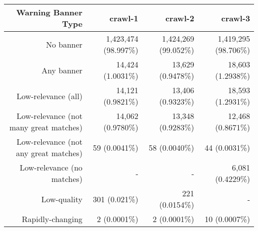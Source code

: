 \begin{tabular}{rrrr}
\toprule
\textbf{Warning Banner Type} & \textbf{crawl-1} & \textbf{crawl-2} & \textbf{crawl-3} \\
\midrule
No banner & 1,423,474 (98.997\%) & 1,424,269 (99.052\%) & 1,419,295 (98.706\%) \\
Any banner & 14,424 (1.0031\%) & 13,629 (0.9478\%) & 18,603 (1.2938\%) \\
Low-relevance (all) & 14,121 (0.9821\%) & 13,406 (0.9323\%) & 18,593 (1.2931\%) \\
Low-relevance (not many great matches) & 14,062 (0.9780\%) & 13,348 (0.9283\%) & 12,468 (0.8671\%) \\
Low-relevance (not any great matches) & 59 (0.0041\%) & 58 (0.0040\%) & 44 (0.0031\%) \\
Low-relevance (no matches) & - & - & 6,081 (0.4229\%) \\
Low-quality & 301 (0.021\%) & 221 (0.0154\%) & - \\
Rapidly-changing & 2 (0.0001\%) & 2 (0.0001\%) & 10 (0.0007\%) \\
\bottomrule
\end{tabular}
